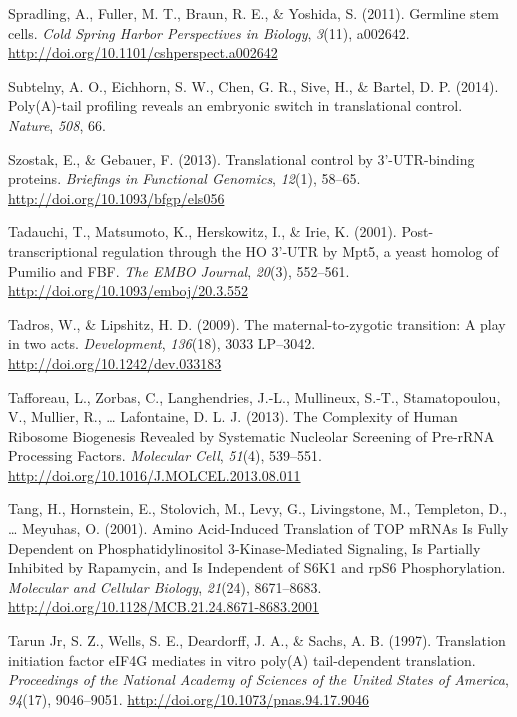 \documentclass[12pt,twoside]{reedthesis}
\newlength{\cslhangindent}
\newenvironment{cslreferences}%
  {\setlength{\parindent}{0pt}%
  \everypar{\setlength{\hangindent}{\cslhangindent}}\ignorespaces}%
  {\par}
\begin{document}
\begin{cslreferences}
\leavevmode\hypertarget{ref-Spradling2011f}{}%
Spradling, A., Fuller, M. T., Braun, R. E., \& Yoshida, S. (2011). Germline stem cells. \emph{Cold Spring Harbor Perspectives in Biology}, \emph{3}(11), a002642. \url{http://doi.org/10.1101/cshperspect.a002642}

\leavevmode\hypertarget{ref-Subtelny2014a}{}%
Subtelny, A. O., Eichhorn, S. W., Chen, G. R., Sive, H., \& Bartel, D. P. (2014). Poly(A)-tail profiling reveals an embryonic switch in translational control. \emph{Nature}, \emph{508}, 66.

\leavevmode\hypertarget{ref-Szostak2013l}{}%
Szostak, E., \& Gebauer, F. (2013). Translational control by 3'-UTR-binding proteins. \emph{Briefings in Functional Genomics}, \emph{12}(1), 58--65. \url{http://doi.org/10.1093/bfgp/els056}

\leavevmode\hypertarget{ref-Tadauchi2001a}{}%
Tadauchi, T., Matsumoto, K., Herskowitz, I., \& Irie, K. (2001). Post-transcriptional regulation through the HO 3'-UTR by Mpt5, a yeast homolog of Pumilio and FBF. \emph{The EMBO Journal}, \emph{20}(3), 552--561. \url{http://doi.org/10.1093/emboj/20.3.552}

\leavevmode\hypertarget{ref-Tadros2009c}{}%
Tadros, W., \& Lipshitz, H. D. (2009). The maternal-to-zygotic transition: A play in two acts. \emph{Development}, \emph{136}(18), 3033 LP--3042. \url{http://doi.org/10.1242/dev.033183}

\leavevmode\hypertarget{ref-Tafforeau2013a}{}%
Tafforeau, L., Zorbas, C., Langhendries, J.-L., Mullineux, S.-T., Stamatopoulou, V., Mullier, R., \ldots{} Lafontaine, D. L. J. (2013). The Complexity of Human Ribosome Biogenesis Revealed by Systematic Nucleolar Screening of Pre-rRNA Processing Factors. \emph{Molecular Cell}, \emph{51}(4), 539--551. \url{http://doi.org/10.1016/J.MOLCEL.2013.08.011}

\leavevmode\hypertarget{ref-tangAminoAcidInducedTranslation2001}{}%
Tang, H., Hornstein, E., Stolovich, M., Levy, G., Livingstone, M., Templeton, D., \ldots{} Meyuhas, O. (2001). Amino Acid-Induced Translation of TOP mRNAs Is Fully Dependent on Phosphatidylinositol 3-Kinase-Mediated Signaling, Is Partially Inhibited by Rapamycin, and Is Independent of S6K1 and rpS6 Phosphorylation. \emph{Molecular and Cellular Biology}, \emph{21}(24), 8671--8683. \url{http://doi.org/10.1128/MCB.21.24.8671-8683.2001}

\leavevmode\hypertarget{ref-TarunJr1997l}{}%
Tarun Jr, S. Z., Wells, S. E., Deardorff, J. A., \& Sachs, A. B. (1997). Translation initiation factor eIF4G mediates in vitro poly(A) tail-dependent translation. \emph{Proceedings of the National Academy of Sciences of the United States of America}, \emph{94}(17), 9046--9051. \url{http://doi.org/10.1073/pnas.94.17.9046}


\end{cslreferences}
\end{document}
